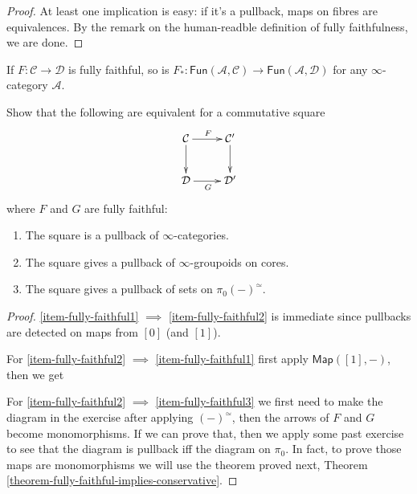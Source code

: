 \begin{proof}
At least one implication is easy:
if it's a pullback,
maps on fibres are equivalences.
By the remark on the human-readble
definition of fully faithfulness, we are done.
\end{proof}

\begin{lemma}
\label{lemma-fully-faithfulness-is-preserved-by-Fun(A,-)}
If $F:\mathcal{C} \to \mathcal{D}$ is fully faithful,
so is
$F_*:
\mathsf{Fun}(\mathcal{A},\mathcal{C})\to\mathsf{Fun}(\mathcal{A},\mathcal{D})$ 
for any $\infty$-category $\mathcal{A}$.
\end{lemma}

\begin{exercise}
\label{exercise-characterization-of-pullbacks-for-fully-faithful}
Show that the following are equivalent for a commutative square
$$
\xymatrix{
\mathcal{C}\ar[r]^F\ar[d]&\mathcal{C}'\ar[d]\\
\mathcal{D}\ar[r]_G&\mathcal{D}'
}
$$
where $F$ and $G$ are fully faithful:
\begin{enumerate}
\item The square is a pullback of $\infty$-categories.
\label{item-fully-faithful1}

\item The square gives a pullback of $\infty$-groupoids on cores.
\label{item-fully-faithful2}

\item The square gives a pullback of sets on $\pi_0(-)^\simeq$.
\label{item-fully-faithful3}
\end{enumerate} 
\end{exercise}

\begin{proof}
\ref{item-fully-faithful1} $\implies$ \ref{item-fully-faithful2}
is immediate since pullbacks are detected on maps from $[0]$ 
(and $[1]$).

For \ref{item-fully-faithful2} $\implies$ \ref{item-fully-faithful1}
first apply $\mathsf{Map}([1],-)$, then we get

For \ref{item-fully-faithful2} $\implies$ \ref{item-fully-faithful3}
we first need to make the diagram in the exercise
after applying $(-)^{\simeq}$, then
the arrows of $F$ and $G$ become monomorphisms.
If we can prove that, then
we apply some past exercise to see that
the diagram is pullback iff the diagram on $\pi_0$.
In fact, to prove those maps are monomorphisms
we will use the theorem proved next,
Theorem \ref{theorem-fully-faithful-implies-conservative}.
\end{proof}


